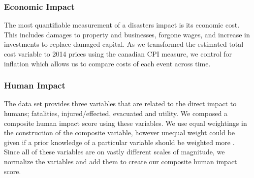 \subsubsection{Economic Impact}
The most quantifiable measurement of a disasters impact is its economic cost. This includes damages to property and businesses, forgone wages, and increase in investments to replace damaged capital. As we transformed the estimated total cost variable to 2014 prices using the canadian CPI measure, we control for inflation which allows us to compare costs of each event across time.
\subsubsection{Human Impact}
The data set provides three variables that are related to the direct impact to humans; fatalities, injured/effected, evacuated and utility. We composed a composite human impact score using these variables. We use equal weightings in the construction of the composite variable, however unequal weight could be given if a prior knowledge of a particular variable should be weighted more \cite{song2013composite}.
Since all of these variables are on vastly different scales of magnitude, we normalize the variables and add them to create our composite human impact score. 


